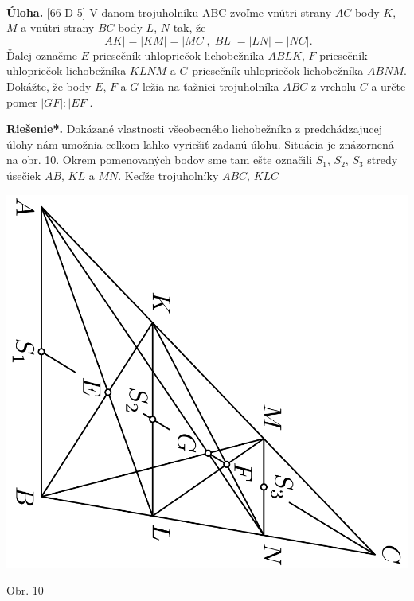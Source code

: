 \documentclass[11pt,a4paper,oneside,final]{book}
\newcommand{\ul}{\textbf{Úloha.} }
\newcommand{\rieh}{\textbf{Riešenie*.} }
\begin{document}
\\
\begin{tcolorbox}[breakable,notitle,boxrule=0pt,colback=light-gray,colframe=light-gray]\ul [66-D-5] V danom trojuholníku ABC zvoľme vnútri strany $AC$ body $K$, $M$ a vnútri strany $BC$ body $L$, $N$ tak, že
$$|AK| = |KM| = |MC|, |BL| = |LN| = |NC|.$$
Ďalej označme $E$ priesečník uhlopriečok lichobežníka $ABLK$, $F$ priesečník uhlopriečok lichobežníka $KLNM$ a $G$ priesečník uhlopriečok lichobežníka $ABNM$. Dokážte, že body $E$, $F$ a $G$ ležia na ťažnici trojuholníka $ABC$ z vrcholu $C$ a určte pomer $|GF| : |EF|$.

\end{tcolorbox}

\rieh
Dokázané vlastnosti všeobecného lichobežníka z predchádzajucej úlohy nám umožnia celkom ľahko vyriešiť zadanú úlohu. Situácia je znázornená na obr. 10. Okrem pomenovaných bodov sme tam ešte označili $S_1$, $S_2$, $S_3$ stredy úsečiek $AB$, $KL$ a $MN$. Keďže trojuholníky $ABC$, $KLC$
\begin{center}
\includegraphics[scale=0.3, angle=90]{66D52}

Obr. 10
\end{center}
\end{document}
